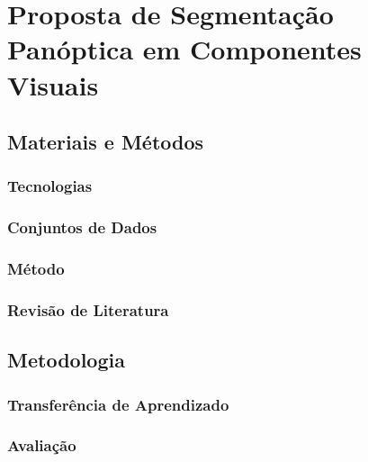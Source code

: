 \newpage
\clearpage
\section{Proposta de Segmentação Panóptica em Componentes Visuais}
\label{proposal:proposal}

\subsection{Materiais e Métodos}
\label{proposal:matmet}

\subsubsection{Tecnologias}
\label{proposal:tec}

\subsubsection{Conjuntos de Dados}
\label{proposal:dataset}

\subsubsection{Método}
\label{proposal:method}

\subsubsection{Revisão de Literatura}
\label{proposal:}

\subsection{Metodologia}
\label{proposal:methodology}

\subsubsection{Transferência de Aprendizado}
\label{proposal:transf}

\subsubsection{Avaliação}
\label{proposal:avaliation}
